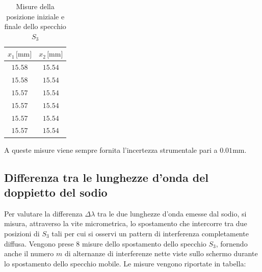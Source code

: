 \documentclass[]{article}
\let\oldsubsection\subsection%
\renewcommand{\subsection}{%
	\renewcommand{\theequation}{\thesubsection.\arabic{equation}}%
	\oldsubsection}%
\begin{document}
\begin{table}[H]
    \centering

    \begin{tabular}{||c|c||}
        \hline
        $x_1 \, \text{[mm]}$ & $x_2\, \text{[mm]}$ \\
        \hline\hline

        $15.58$ & $15.54$ \\\hline
        $15.58$ & $15.54$ \\\hline
        $15.57$ & $15.54$ \\\hline
        $15.57$ & $15.54$ \\\hline
        $15.57$ & $15.54$ \\\hline
        $15.57$ & $15.54$ \\\hline
    
    \end{tabular}
    \caption{Misure della posizione iniziale e finale dello specchio $S_3$}
    \label{L}    
\end{table}
A queste misure viene sempre fornita l'incertezza strumentale pari a $0.01\text{mm}$.

\subsection{Differenza tra le lunghezze d'onda del doppietto del sodio}

Per valutare la differenza $\Delta \lambda$ tra le due lunghezze d'onda emesse dal sodio, si misura, attraverso la vite micrometrica, lo spostamento che intercorre tra due posizioni di $S_3$ tali per cui si osservi un pattern di interferenza completamente diffusa. Vengono prese 8 misure dello spostamento dello specchio $S_3$, fornendo anche il numero $m$ di alternanze di interferenze nette viste sullo schermo durante lo spostamento dello specchio mobile. Le misure vengono riportate in tabella:
\end{document}
